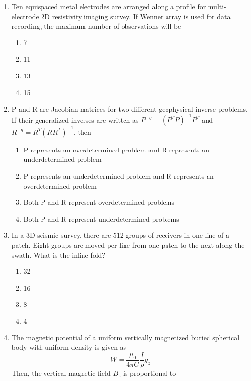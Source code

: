 \documentclass[journal,12pt,onecolumn]{IEEEtran}
\begin{document}
\begin{enumerate}
\item Ten equispaced metal electrodes are arranged along a profile for multi-electrode 2D resistivity imaging survey. If Wenner array is used for data recording, the maximum number of observations will be

\hfill{}
\begin{multicols}{4}
\begin{enumerate}
    \item 7
    \item 11
    \item 13
    \item 15
\end{enumerate}
\end{multicols}

\item P and R are Jacobian matrices for two different geophysical inverse problems. If their generalized inverses are written as $P^{-g} = (P^T P)^{-1} P^T$ and $R^{-g} = R^T(R R^T)^{-1}$, then

\hfill{}
\begin{enumerate}
    \item P represents an overdetermined problem and R represents an underdetermined problem
    \item P represents an underdetermined problem and R represents an overdetermined problem
    \item Both P and R represent overdetermined problems
    \item Both P and R represent underdetermined problems
\end{enumerate}


\item In a 3D seismic survey, there are 512 groups of receivers in one line of a patch. Eight groups are moved per line from one patch to the next along the swath. What is the inline fold?

\hfill{}

\begin{multicols}{4}
\begin{enumerate}
\item 32
\item 16
\item 8
\item 4
\end{enumerate}
\end{multicols}


\item The magnetic potential of a uniform vertically magnetized buried spherical body with uniform density is given as 
\[
W = \frac{\mu_0}{4\pi G} \frac{I}{\rho} g_z
\]
Then, the vertical magnetic field $B_z$ is proportional to


\end{enumerate}
\end{document}
